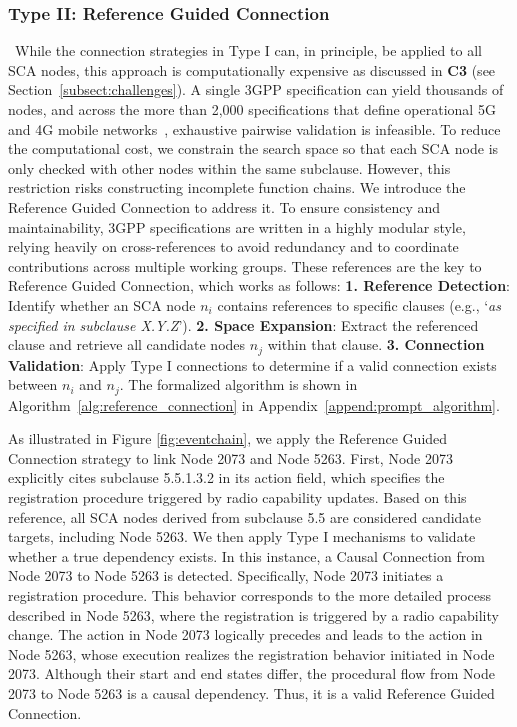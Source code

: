 \subsubsection{Type II: Reference Guided Connection} 
~While the connection strategies in Type I can, in principle, be applied to all SCA nodes, this approach is computationally expensive as discussed in \textbf{C3} (see Section~\ref{subsect:challenges}).  
A single 3GPP specification can yield thousands of nodes, and across the more than 2,000 specifications that define operational 5G and 4G mobile networks~\cite{3gppspecs}, exhaustive pairwise validation is infeasible. 
To reduce the computational cost, we constrain the search space so that each SCA node is only checked with other nodes within the same subclause. However, this restriction risks constructing incomplete function chains. 
We introduce the Reference Guided Connection to address it. 
To ensure consistency and maintainability, 3GPP specifications are written in a highly modular style, relying heavily on cross-references to avoid redundancy and to coordinate contributions across multiple working groups. 
These references are the key to Reference Guided Connection, which works as follows: 
\noindent \textbf{1. Reference Detection}: Identify whether an SCA node \( n_i \) contains references to specific clauses (e.g., `\textit{as specified in subclause X.Y.Z}'). 
\textbf{2. Space Expansion}: Extract the referenced clause and retrieve all candidate nodes \( n_j \) within that clause. 
\textbf{3. Connection Validation}: Apply Type I connections to determine if a valid connection exists between \( n_i \) and \( n_j \).
The formalized algorithm is shown in Algorithm~\ref{alg:reference_connection} in Appendix~\ref{append:prompt_algorithm}.

As illustrated in Figure \ref{fig:eventchain}, we apply the Reference Guided Connection strategy to link Node 2073 and Node 5263. First, Node 2073 explicitly cites subclause 5.5.1.3.2 in its action field, which specifies the registration procedure triggered by radio capability updates. Based on this reference, all SCA nodes derived from subclause 5.5 are considered candidate targets, including Node 5263.
We then apply Type I mechanisms to validate whether a true dependency exists. In this instance, a Causal Connection from Node 2073 to Node 5263 is detected. Specifically, Node 2073 initiates a registration procedure. This behavior corresponds to the more detailed process described in Node 5263, where the registration is triggered by a radio capability change. The action in Node 2073 logically precedes and leads to the action in Node 5263, whose execution realizes the registration behavior initiated in Node 2073. Although their start and end states differ, the procedural flow from Node 2073 to Node 5263 is a causal dependency. Thus, it is a valid Reference Guided Connection.


